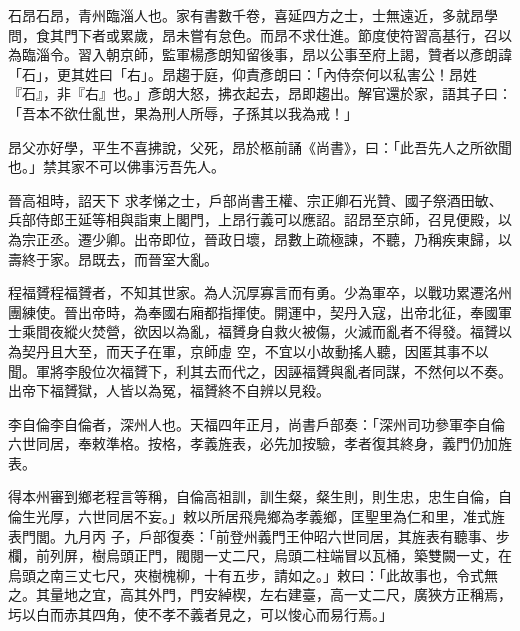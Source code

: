 \begin{pinyinscope}
 石昂石昂，青州臨淄人也。家有書數千卷，喜延四方之士，士無遠近，多就昂學問，食其門下者或累歲，昂未嘗有怠色。而昂不求仕進。節度使符習高基行，召以為臨淄令。習入朝京師，監軍楊彥朗知留後事，昂以公事至府上謁，贊者以彥朗諱「石」，更其姓曰「右」。昂趨于庭，仰責彥朗曰：「內侍奈何以私害公！昂姓『石』，非『右』也。」彥朗大怒，拂衣起去，昂即趨出。解官還於家，語其子曰：「吾本不欲仕亂世，果為刑人所辱，子孫其以我為戒！」



 昂父亦好學，平生不喜拂說，父死，昂於柩前誦《尚書》，曰：「此吾先人之所欲聞也。」禁其家不可以佛事污吾先人。



 晉高祖時，詔天下
 求孝悌之士，戶部尚書王權、宗正卿石光贊、國子祭酒田敏、兵部侍郎王延等相與詣東上閣門，上昂行義可以應詔。詔昂至京師，召見便殿，以為宗正丞。遷少卿。出帝即位，晉政日壞，昂數上疏極諫，不聽，乃稱疾東歸，以壽終于家。昂既去，而晉室大亂。



 程福贇程福贇者，不知其世家。為人沉厚寡言而有勇。少為軍卒，以戰功累遷洺州團練使。晉出帝時，為奉國右廂都指揮使。開運中，契丹入寇，出帝北征，奉國軍士乘間夜縱火焚營，欲因以為亂，福贇身自救火被傷，火滅而亂者不得發。福贇以為契丹且大至，而天子在軍，京師虛
 空，不宜以小故動搖人聽，因匿其事不以聞。軍將李殷位次福贇下，利其去而代之，因誣福贇與亂者同謀，不然何以不奏。出帝下福贇獄，人皆以為冤，福贇終不自辨以見殺。



 李自倫李自倫者，深州人也。天福四年正月，尚書戶部奏：「深州司功參軍李自倫六世同居，奉敕準格。按格，孝義旌表，必先加按驗，孝者復其終身，義門仍加旌表。



 得本州審到鄉老程言等稱，自倫高祖訓，訓生粲，粲生則，則生忠，忠生自倫，自倫生光厚，六世同居不妄。」敕以所居飛鳧鄉為孝義鄉，匡聖里為仁和里，准式旌表門閭。九月丙
 子，戶部復奏：「前登州義門王仲昭六世同居，其旌表有聽事、步欄，前列屏，樹烏頭正門，閥閱一丈二尺，烏頭二柱端冒以瓦桶，築雙闕一丈，在烏頭之南三丈七尺，夾樹槐柳，十有五步，請如之。」敕曰：「此故事也，令式無之。其量地之宜，高其外門，門安綽楔，左右建臺，高一丈二尺，廣狹方正稱焉，圬以白而赤其四角，使不孝不義者見之，可以悛心而易行焉。」



\end{pinyinscope}